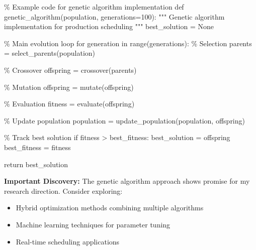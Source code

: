\documentclass[12pt,a4paper,twoside]{article}
\begin{document}
\begin{codebox}
\% Example code for genetic algorithm implementation
def genetic\_algorithm(population, generations=100):
    """
    Genetic algorithm implementation for production scheduling
    """
    best\_solution = None
    
    \% Main evolution loop
    for generation in range(generations):
        \% Selection
        parents = select\_parents(population)
        
        \% Crossover
        offspring = crossover(parents)
        
        \% Mutation
        offspring = mutate(offspring)
        
        \% Evaluation
        fitness = evaluate(offspring)
        
        \% Update population
        population = update\_population(population, offspring)
        
        \% Track best solution
        if fitness > best\_fitness:
            best\_solution = offspring
            best\_fitness = fitness
    
    return best\_solution
\end{codebox}

\begin{note}
\textbf{Important Discovery:} The genetic algorithm approach shows promise for my research direction. Consider exploring:
\begin{itemize}
    \item Hybrid optimization methods combining multiple algorithms
    \item Machine learning techniques \cite{goodfellow2014generative} for parameter tuning
    \item Real-time scheduling applications
\end{itemize}
\end{note}
\end{document}
